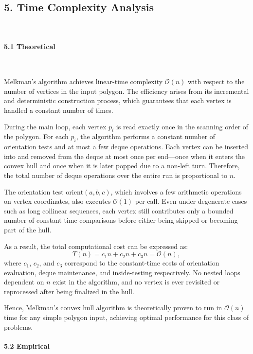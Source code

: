 \documentclass{article}
\begin{document}
\subsection*{5. Time Complexity Analysis}\

\paragraph{5.1 Theoretical}\

Melkman’s algorithm achieves linear-time complexity $\mathcal{O}(n)$ with respect to the number of vertices in the input polygon. 
The efficiency arises from its incremental and deterministic construction process, which guarantees that each vertex is handled a constant number of times. 

During the main loop, each vertex $p_i$ is read exactly once in the scanning order of the polygon. 
For each $p_i$, the algorithm performs a constant number of orientation tests and at most a few deque operations. 
Each vertex can be inserted into and removed from the deque at most once per end—once when it enters the convex hull and once when it is later popped due to a non-left turn. 
Therefore, the total number of deque operations over the entire run is proportional to $n$.

The orientation test $\text{orient}(a,b,c)$, which involves a few arithmetic operations on vertex coordinates, also executes $\mathcal{O}(1)$ per call. 
Even under degenerate cases such as long collinear sequences, each vertex still contributes only a bounded number of constant-time comparisons before either being skipped or becoming part of the hull.

As a result, the total computational cost can be expressed as:
\[
T(n) = c_1 n + c_2 n + c_3 n = \mathcal{O}(n),
\]
where $c_1$, $c_2$, and $c_3$ correspond to the constant-time costs of orientation evaluation, deque maintenance, and inside-testing respectively. 
No nested loops dependent on $n$ exist in the algorithm, and no vertex is ever revisited or reprocessed after being finalized in the hull. 

Hence, Melkman’s convex hull algorithm is theoretically proven to run in $\mathcal{O}(n)$ time for any simple polygon input, achieving optimal performance for this class of problems.

\paragraph{5.2 Empirical}\
\end{document}
